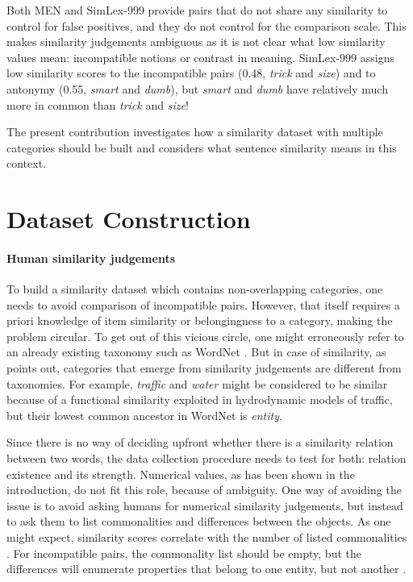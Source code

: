 \documentclass[11pt]{article}
\begin{document}
Both MEN and SimLex-999 provide pairs that do not share any similarity to control for false positives, and they do not control for the comparison scale. This makes similarity judgements ambiguous as it is not clear what low similarity values mean: incompatible notions or contrast in meaning. SimLex-999 assigns low similarity scores to the incompatible pairs (0.48, \textit{trick} and \textit{size}) and to antonymy (0.55, \textit{smart} and \textit{dumb}), but \textit{smart} and \textit{dumb} have relatively much more in common than \textit{trick} and \textit{size}!

The present contribution investigates how a similarity dataset with multiple categories should be built and considers what sentence similarity means in this context.

\section{Dataset Construction}

\paragraph{Human similarity judgements}

To build a similarity dataset which contains non-overlapping categories, one needs to avoid comparison of incompatible pairs. However, that itself requires a priori knowledge of item similarity or belongingness to a category, making the problem circular. To get out of this vicious circle, one might erroneously  refer to an already existing taxonomy such as WordNet \cite{Miller:1995:WLD:219717.219748}. But in case of similarity, as  points out, categories that emerge from similarity judgements are different from taxonomies. For example, \textit{traffic} and \textit{water} might be considered to be similar because of a functional similarity exploited in hydrodynamic models of traffic, but their lowest common ancestor in WordNet is \textit{entity}.

Since there is no way of deciding upfront whether there is a similarity relation between two words, the data collection procedure needs to test for both: relation existence and its strength. Numerical values, as has been shown in the introduction, do not fit this role, because of ambiguity. One way of avoiding the issue is to avoid asking humans for numerical similarity judgements, but instead to ask them to list commonalities and differences between the objects. As one might expect, similarity scores correlate with the number of listed commonalities \cite{markman1991commonalities,Markman1996,medin1993respects}. For incompatible pairs, the commonality list should be empty, but the differences will enumerate properties that belong to one entity, but not another \cite{markman1991commonalities,medin1993respects}.
\end{document}
